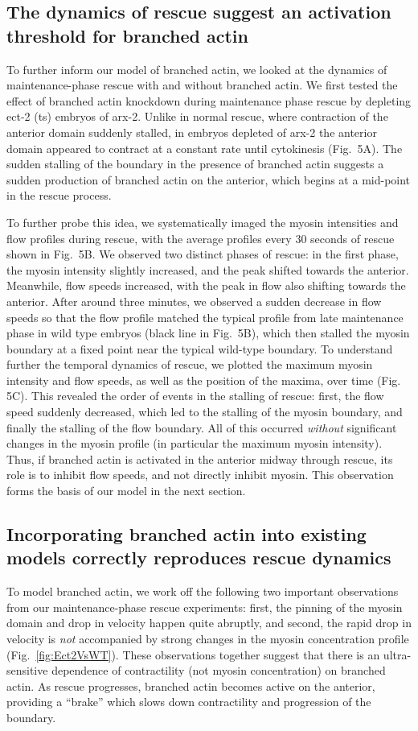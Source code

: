 \documentclass[11pt]{article}
\newcommand{\6}[1]{#1_{\text{6}}}
\newcommand{\3}[1]{#1_{\text{3}}}
\begin{document}
\subsection*{The dynamics of rescue suggest an activation threshold for branched actin}
To further inform our model of branched actin, we looked at the dynamics of maintenance-phase rescue with and without branched actin. We first tested the effect of branched actin knockdown during maintenance phase rescue by depleting ect-2 (ts) embryos of arx-2. Unlike in normal rescue, where contraction of the anterior domain suddenly stalled, in embryos depleted of arx-2 the anterior domain appeared to contract at a constant rate until cytokinesis (Fig.\ 5A). The sudden stalling of the boundary in the presence of branched actin suggests a sudden production of branched actin on the anterior, which begins at a mid-point in the rescue process. 

To further probe this idea, we systematically imaged the myosin intensities and flow profiles during rescue, with the average profiles every 30 seconds of rescue shown in Fig.\ 5B. We observed two distinct phases of rescue: in the first phase, the myosin intensity slightly increased, and the peak shifted towards the anterior. Meanwhile, flow speeds increased, with the peak in flow also shifting towards the anterior. After around three minutes, we observed a sudden decrease in flow speeds so that the flow profile matched the typical profile from late maintenance phase in wild type embryos (black line in Fig.\ 5B), which then stalled the myosin boundary at a fixed point near the typical wild-type boundary. To understand further the temporal dynamics of rescue, we plotted the maximum myosin intensity and flow speeds, as well as the position of the maxima, over time (Fig. 5C). This revealed the order of events in the stalling of rescue: first, the flow speed suddenly decreased, which led to the stalling of the myosin boundary, and finally the stalling of the flow boundary. All of this occurred \emph{without} significant changes in the myosin profile (in particular the maximum myosin intensity). Thus, if branched actin is activated in the anterior midway through rescue, its role is to inhibit flow speeds, and not directly inhibit myosin. This observation forms the basis of our model in the next section.

\subsection*{Incorporating branched actin into existing models correctly reproduces rescue dynamics}
To model branched actin, we work off the following two important observations from our maintenance-phase rescue experiments: first, the pinning of the myosin domain and drop in velocity happen quite abruptly, and second, the rapid drop in velocity is \emph{not} accompanied by strong changes in the myosin concentration profile (Fig.\ \ref{fig:Ect2VsWT}). These observations together suggest that there is an ultra-sensitive dependence of contractility (not myosin concentration) on branched actin. As rescue progresses, branched actin becomes active on the anterior, providing a ``brake'' which slows down contractility and progression of the boundary.
\end{document}
